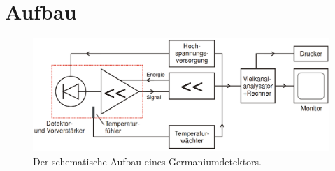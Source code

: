 \section{Aufbau}
\label{sec:Aufbau}

\begin{figure}
	\centering
	\includegraphics[width=\linewidth-100pt,height=\textheight-100pt,keepaspectratio]{content/Images/detektor.png}
    \caption{Der schematische Aufbau eines Germaniumdetektors\cite{V18}.}
    \label{fig:detektor}
\end{figure}

